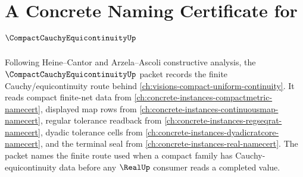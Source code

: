 \chapter{A Concrete Naming Certificate for $\CompactCauchyEquicontinuityUp$}
\label{ch:concrete-instances-compact-cauchy-equicontinuity-namecert}

Following Heine--Cantor and Arzela--Ascoli constructive analysis, the $\CompactCauchyEquicontinuityUp$ packet records the finite Cauchy/equicontinuity route behind \autoref{ch:visions-compact-uniform-continuity}. It reads compact finite-net data from \autoref{ch:concrete-instances-compactmetric-namecert}, displayed map rows from \autoref{ch:concrete-instances-continuousmap-namecert}, regular tolerance readback from \autoref{ch:concrete-instances-regseqrat-namecert}, dyadic tolerance cells from \autoref{ch:concrete-instances-dyadicratcore-namecert}, and the terminal seal from \autoref{ch:concrete-instances-real-namecert}. The packet names the finite route used when a compact family has Cauchy-equicontinuity data before any $\RealUp$ consumer reads a completed value.

